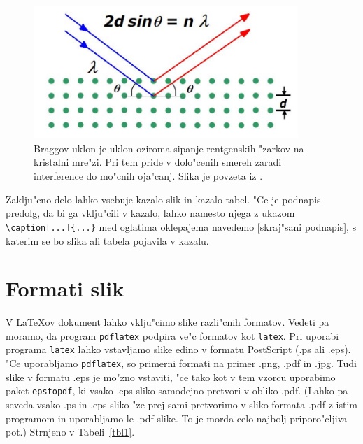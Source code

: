\begin{figure}[h]
\begin{center}
\includegraphics[width=10cm]{Bragglaw}
\end{center}
\caption[Braggov uklon.]{Braggov uklon je uklon oziroma sipanje rentgenskih "zarkov na kristalni mre"zi. 
Pri tem pride v dolo"cenih smereh zaradi interference do mo"cnih oja"canj. Slika je povzeta iz \cite{Bragg}.}
\label{pic1}
\end{figure}


Zaklju"cno delo lahko vsebuje kazalo slik in kazalo tabel. 
"Ce je podnapis predolg, da bi ga vklju"cili v kazalo, lahko namesto njega z ukazom \verb|\caption[...]{...}| med oglatima oklepajema navedemo [skraj"sani podnapis], s katerim se bo slika ali tabela pojavila v kazalu.

\newpage
\section{Formati slik}

V \LaTeX{}ov dokument lahko vklju"cimo slike razli"cnih formatov. 
Vedeti pa moramo, da program {\tt pdflatex} podpira ve"c formatov kot {\tt latex}. 
Pri uporabi programa {\tt latex} lahko vstavljamo slike edino v formatu PostScript (.ps ali .eps). 
"Ce uporabljamo {\tt pdflatex}, so primerni formati na primer .png, .pdf in .jpg.  
Tudi slike v formatu .eps je mo"zno vstaviti, "ce tako kot v tem vzorcu uporabimo paket {\tt epstopdf}, ki vsako .eps sliko samodejno pretvori v obliko .pdf.  
(Lahko pa seveda vsako .ps in .eps sliko "ze prej sami pretvorimo v sliko formata .pdf z istim programom in uporabljamo le .pdf slike.  
To je morda celo najbolj priporo"cljiva pot.)  
Strnjeno v Tabeli~\ref{tbl1}.

